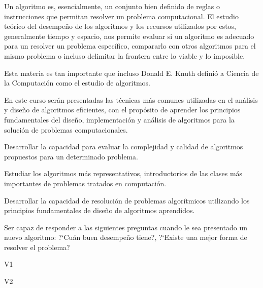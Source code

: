 \begin{syllabus}


\begin{justification}
Un algoritmo es, esencialmente, un conjunto bien definido de reglas o instrucciones
que permitan resolver un problema computacional. El estudio teórico del desempeño
de los algoritmos y los recursos utilizados por estos, generalmente tiempo y espacio, 
nos permite evaluar si un algoritmo es adecuado para un resolver un problema 
específico, compararlo con otros algoritmos para el mismo problema o incluso
delimitar la frontera entre lo viable y lo imposible.

Esta materia es tan importante que incluso Donald E. Knuth definió a
Ciencia de la Computación como el estudio de algoritmos.

En este curso serán presentadas las técnicas más comunes utilizadas en el análisis y diseño de 
algoritmos eficientes, con el propósito de aprender los principios fundamentales
del diseño, implementación y análisis de algoritmos para la solución de problemas
computacionales.
\end{justification}

\begin{goals} 
\item Desarrollar la capacidad para evaluar la complejidad y calidad de algoritmos propuestos para un determinado problema.
\item Estudiar los algoritmos más representativos, introductorios de las clases más importantes de problemas tratados en computación.
\item Desarrollar la capacidad de resolución de problemas algorítmicos utilizando los principios fundamentales de diseño de algoritmos aprendidos.
\item Ser capaz de responder a las siguientes preguntas cuando le sea presentado un nuevo algoritmo: ?`Cuán buen desempeño tiene?, ?`Existe una mejor forma de resolver el problema?
\end{goals}

\begin{outcomes}{V1}
    \item {} 
    \item {} 
\end{outcomes}

\begin{outcomes}{V2}
    \item {} 
    \item {} 
\end{outcomes}


\end{syllabus}
